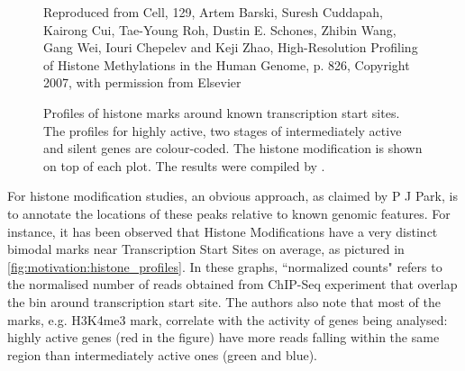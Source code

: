 \documentclass[parskip]{cs4rep}
\newcommand{\histonemodification}[1]{#1}
\begin{document}
\begin{figure}[p]
   \centering
   {Reproduced from Cell, 129, Artem Barski, Suresh Cuddapah, Kairong Cui, Tae-Young Roh, Dustin E. Schones, Zhibin Wang, Gang Wei, Iouri Chepelev and Keji Zhao, High-Resolution Profiling of Histone Methylations in the Human Genome\cite{Barski:2007ww}, p. 826, Copyright 2007, with permission from Elsevier}
   \caption{Profiles of histone marks around known transcription start sites. The profiles for highly active, two stages of intermediately active and silent genes are colour-coded. The histone modification is shown on top of each plot. The results were compiled by \cite{Barski:2007ww}.}
    \label{fig:motivation:histone_profiles}
\end{figure}

For histone modification studies, an obvious approach, as claimed by P J Park, is to annotate the locations of these peaks relative to known genomic features. For instance, it has been observed
that Histone Modifications have a very distinct bimodal marks near Transcription Start Sites on average\cite{Barski:2007ww}, as pictured in \autoref{fig:motivation:histone_profiles}. In these graphs, ``normalized counts" refers to the normalised number of reads obtained from ChIP-Seq experiment that overlap the bin around transcription start site. The authors also note that most of the marks, e.g.
\histonemodification{H3K4me3} mark, correlate with the activity of genes being analysed: highly active genes (red in the figure) have more reads falling within the same region than intermediately active ones (green and blue).
\end{document}

